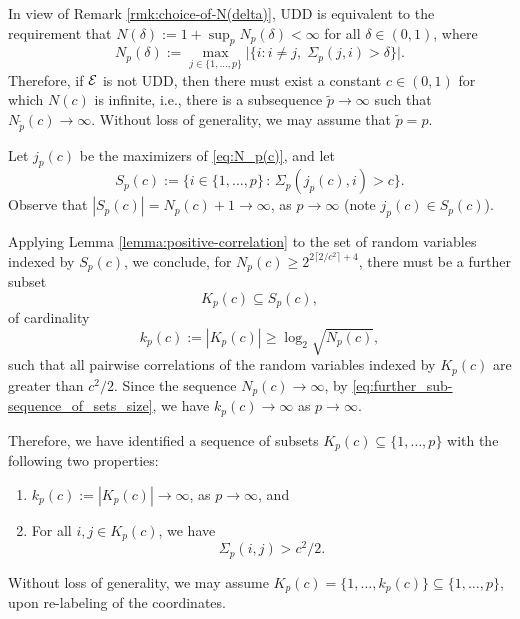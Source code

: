
In view of Remark \ref{rmk:choice-of-N(delta)}, UDD is equivalent to the requirement that
$N(\delta) := 1+\sup_{p} N_p(\delta) < \infty$ for all $\delta\in(0,1)$,
where 
\begin{equation} \label{eq:N_p(c)}
    N_p(\delta) := \max_{j\in\{1,\ldots,p\}} \Big|\{i:i\neq j,\;\Sigma_p(j,i) > \delta\}\Big|.
\end{equation}
Therefore, if ${\cal E}$ is not UDD, then there must exist a constant $c\in (0,1)$ for which $N(c)$ is infinite, i.e., there is a subsequence $\widetilde p\to\infty$ such that $N_{\widetilde p}(c) \to \infty$.
Without loss of generality,  we may assume that $\widetilde{p}=p$.

Let $j_p(c)$ be the maximizers of \eqref{eq:N_p(c)}, and let
\begin{equation} \label{eq:sub-sequence_of_sets}
S_p(c):= \{ i\in\{1,\dots,p\}\, :\, \Sigma_p(j_p(c), i) > c \}.%
\end{equation}
Observe that $|S_p(c)| = N_p(c)+1 \to \infty$, as $p\to\infty$ 
(note $j_p(c) \in S_{p}(c)$).

Applying Lemma \ref{lemma:positive-correlation} to the set of random variables indexed by $S_p(c)$, we conclude, for $N_p(c) \ge 2^{2\lceil2/c^2\rceil+4}$, there must be a further subset 
\begin{equation} \label{eq:further_sub-sequence_of_sets}
  K_p(c) \subseteq S_p(c),
\end{equation}
of cardinality 
\begin{equation} \label{eq:further_sub-sequence_of_sets_size}
k_p(c) := \left|K_p(c)\right| \ge \log_2{\sqrt{N_p(c)}},
\end{equation}
such that all pairwise correlations of the random variables indexed by $K_p(c)$ are greater than $c^2/2$.
Since the sequence $N_p(c)\to\infty$, by \eqref{eq:further_sub-sequence_of_sets_size}, we have $k_p(c)\to\infty$ as $p\to\infty$.

Therefore, we have identified a sequence of subsets $K_p(c)\subseteq\{1,\ldots,p\}$ with the following two properties:
\begin{enumerate}
  \item $k_p(c) := \left|K_p(c)\right| \to \infty$, as $p\to\infty$, and
  \item For all $i,j\in K_p(c)$, we have
  \begin{equation} \label{eq:further_sub-sequence_of_sets_cor}
    \Sigma_p(i,j) > c^2/2.
  \end{equation}
\end{enumerate}
Without loss of generality, we may assume $K_p(c) = \{1,\ldots,k_p(c)\} \subseteq \{1,\ldots,p\}$, upon re-labeling of the coordinates. 


